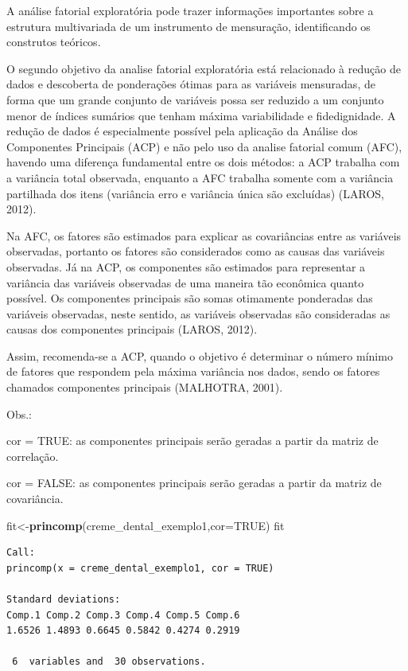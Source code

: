 \documentclass[12pt,brazil,oneside]{book}
\newenvironment{Shaded}{\begin{snugshade}}{\end{snugshade}}
\newcommand{\DataTypeTok}[1]{\textcolor[rgb]{0.13,0.29,0.53}{#1}}
\newcommand{\KeywordTok}[1]{\textcolor[rgb]{0.13,0.29,0.53}{\textbf{#1}}}
\newcommand{\NormalTok}[1]{#1}
\newcommand{\OtherTok}[1]{\textcolor[rgb]{0.56,0.35,0.01}{#1}}
\begin{document}
A análise fatorial exploratória pode trazer informações importantes
sobre a estrutura multivariada de um instrumento de mensuração,
identificando os construtos teóricos.

O segundo objetivo da analise fatorial exploratória está relacionado à
redução de dados e descoberta de ponderações ótimas para as variáveis
mensuradas, de forma que um grande conjunto de variáveis possa ser
reduzido a um conjunto menor de índices sumários que tenham máxima
variabilidade e fidedignidade. A redução de dados é especialmente
possível pela aplicação da Análise dos Componentes Principais (ACP) e
não pelo uso da analise fatorial comum (AFC), havendo uma diferença
fundamental entre os dois métodos: a ACP trabalha com a variância total
observada, enquanto a AFC trabalha somente com a variância partilhada
dos itens (variância erro e variância única são excluídas) (LAROS,
2012).

Na AFC, os fatores são estimados para explicar as covariâncias entre as
variáveis observadas, portanto os fatores são considerados como as
causas das variáveis observadas. Já na ACP, os componentes são estimados
para representar a variância das variáveis observadas de uma maneira tão
econômica quanto possível. Os componentes principais são somas
otimamente ponderadas das variáveis observadas, neste sentido, as
variáveis observadas são consideradas as causas dos componentes
principais (LAROS, 2012).

Assim, recomenda-se a ACP, quando o objetivo é determinar o número
mínimo de fatores que respondem pela máxima variância nos dados, sendo
os fatores chamados componentes principais (MALHOTRA, 2001).

Obs.:

cor = TRUE: as componentes principais serão geradas a partir da matriz
de correlação.

cor = FALSE: as componentes principais serão geradas a partir da matriz
de covariância.

\begin{Shaded}
\begin{Highlighting}[]
\NormalTok{fit<-}\KeywordTok{princomp}\NormalTok{(creme_dental_exemplo1,}\DataTypeTok{cor=}\OtherTok{TRUE}\NormalTok{)}
\NormalTok{fit}
\end{Highlighting}
\end{Shaded}

\begin{verbatim}
Call:
princomp(x = creme_dental_exemplo1, cor = TRUE)

Standard deviations:
Comp.1 Comp.2 Comp.3 Comp.4 Comp.5 Comp.6 
1.6526 1.4893 0.6645 0.5842 0.4274 0.2919 

 6  variables and  30 observations.
\end{verbatim}
\end{document}
